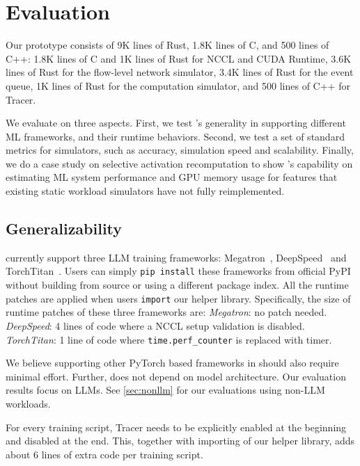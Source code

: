 \section{Evaluation}
\label{sec:eval}
Our \sys prototype consists of 9K lines of Rust, 1.8K lines of C, and 500 lines of C++: 1.8K lines of C and 1K lines of Rust for \sys NCCL and CUDA Runtime, 3.6K lines of Rust for the flow-level network simulator, 3.4K lines of Rust for the event queue, 1K lines of Rust for the computation simulator, and 500 lines of C++ for \sys Tracer.

We evaluate \sys on three aspects. First, we test \sys's generality in supporting different ML frameworks, and their runtime behaviors. 
Second, we test a set of standard metrics for simulators, such as accuracy, simulation speed and scalability. Finally, we do a case study on selective activation recomputation \cite{korthikanti2023ac} to show \sys's capability on estimating ML system performance and GPU memory usage for features that existing static workload simulators have not fully reimplemented.

\subsection{Generalizability}
\label{sec:generalizability}

 \sys currently support three LLM training frameworks: Megatron~\cite{shoeybi2019megatron}, DeepSpeed~\cite{rasley2020deepspeed} and TorchTitan~\cite{liang2025torchtitan}.
Users can simply \texttt{pip install} these frameworks from official PyPI without building from source or using a different package index. All the runtime patches are applied when users \texttt{import} our helper library. Specifically, the size of runtime patches of these three frameworks are: \emph{Megatron}: no patch needed. \emph{DeepSpeed}: 4 lines of code where a NCCL setup validation is disabled. \emph{TorchTitan}: 1 line of code where \texttt{time.perf\_counter} is replaced with \sys timer.

We believe supporting other PyTorch based frameworks in \sys should also require minimal effort. Further, \sys does not depend on model architecture. Our evaluation results focus on LLMs. See \autoref{sec:nonllm} for our evaluations using non-LLM workloads.

 For every training script, \sys Tracer needs to be explicitly enabled at the beginning and disabled at the end. This, together with importing of our helper library, adds about 6 lines of extra code per training script.

